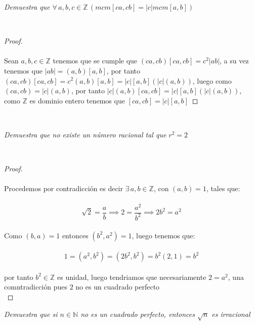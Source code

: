 \documentclass[11pt,letterpaper]{article}
\newcommand{\N}{\mathbb{N}}
\newcommand{\Z}{\mathbb{Z}}
\begin{document}
\begin{tcolorbox}[
	title = \textcolor{black}{\textcolor{white}{Problema 9}},]
\textit{
Demuestra que $\forall\,a,b,c\in \Z\,(mcm[ca,cb]=|c|mcm[a,b])$
}
\end{tcolorbox}\,\\
\begin{proof}\,\\
    \,\\
    Sean $a,b,c \in \Z$ tenemos que se cumple que $(ca,cb)[ca,cb]=c^2|ab|$,  a su vez tenemos que
    $|ab|=(a,b)[a,b]$, por tanto $(ca,cb)[ca,cb]=c^2(a,b)[a,b]=|c|[a,b](|c|(a,b))$, luego
    como $(ca,cb)=|c|(a,b)$, por tanto $|c|(a,b)[ca,cb]=|c|[a,b](|c|(a,b))$, como $\Z$ es dominio entero tenemos que
    $[ca,cb]=|c|[a,b]$
    
\end{proof}\,\\
\begin{tcolorbox}[
	title = \textcolor{black}{\textcolor{white}{Problema 10}},]
\textit{
Demuestra que no existe un n\'umero racional tal que $r^2=2$
}
\end{tcolorbox}\,\\
\begin{proof}\,\\
    \,\\
Procedemos por contradicci\'on es decir $\exists\,a,b\in \Z$, con $(a,b)=1$, tales que:\,\\
    \,\\
    \begin{equation*}
        \sqrt{2}=\frac{a}{b} \implies 2=\frac{a^2}{b^2}\implies 2b^2=a^2
    \end{equation*}\,\\
    Como $(b,a)=1$ entonces $(b^2,a^2)=1$, luego tenemos que:\,\\
    \,\\
    \begin{equation*}
        1=(a^2,b^2)=(2b^2,b^2)=b^2(2,1)=b^2
    \end{equation*}\,\\
    por tanto $b^2\in\Z$ es unidad, luego tendriamos que necesariamente $2=a^2$, una comntradicci\'on pues $2$ no es un cuadrado perfecto
    \,\\
\end{proof}
\newpage
\begin{tcolorbox}[
	title = \textcolor{black}{\textcolor{white}{Problema 11}},]
\textit{
Demuestra que si $n\in \N$ no es un cuadrado perfecto, entonces $\sqrt{n}$ es irracional
}
\end{tcolorbox}\,\\
\end{document}
